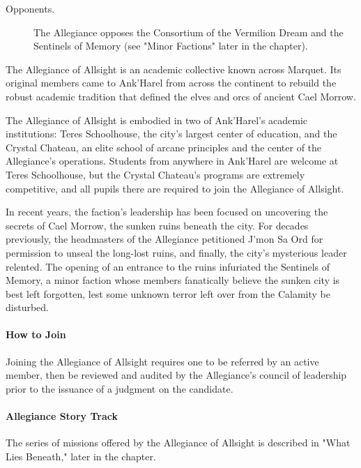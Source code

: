 \documentclass[a4paper, 11pt, bg=full, twocolumn, nooutline]{dndbook}
\begin{document}

\begin{description}
\item[Opponents.] The Allegiance opposes the Consortium of the Vermilion Dream and the Sentinels of Memory (see "Minor Factions" later in the chapter).
\end{description}

The Allegiance of Allsight is an academic collective known across Marquet. Its original members came to Ank'Harel from across the continent to rebuild the robust academic tradition that defined the elves and orcs of ancient Cael Morrow.

The Allegiance of Allsight is embodied in two of Ank'Harel's academic institutions: Teres Schoolhouse, the city's largest center of education, and the Crystal Chateau, an elite school of arcane principles and the center of the Allegiance's operations. Students from anywhere in Ank'Harel are welcome at Teres Schoolhouse, but the Crystal Chateau's programs are extremely competitive, and all pupils there are required to join the Allegiance of Allsight.

In recent years, the faction's leadership has been focused on uncovering the secrets of Cael Morrow, the sunken ruins beneath the city. For decades previously, the headmasters of the Allegiance petitioned J'mon Sa Ord for permission to unseal the long-lost ruins, and finally, the city's mysterious leader relented. The opening of an entrance to the ruins infuriated the Sentinels of Memory, a minor faction whose members fanatically believe the sunken city is best left forgotten, lest some unknown terror left over from the Calamity be disturbed.

\paragraph{How to Join}

Joining the Allegiance of Allsight requires one to be referred by an active member, then be reviewed and audited by the Allegiance's council of leadership prior to the issuance of a judgment on the candidate.

\paragraph{Allegiance Story Track}

The series of missions offered by the Allegiance of Allsight is described in "What Lies Beneath," later in the chapter.
\end{document}
